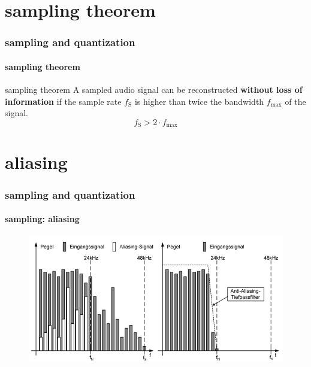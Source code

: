 	\section{sampling theorem}	
		\begin{frame}\frametitle{sampling and quantization}\framesubtitle{sampling theorem}
			\toremember{}
			\begin{block}{sampling theorem}
				\centering
				A sampled audio signal can  be reconstructed \textbf{without loss of information} if the sample rate $f_{\mathrm{S}}$ is higher than twice the bandwidth $f_{\mathrm{max}}$  of the signal.
				\begin{equation*}\label{eq:sample_theorem}	
					f_{\mathrm{S}} > 2\cdot f_{\mathrm{max}}
				\end{equation*}
			\end{block}
		\end{frame}
		
	\section{aliasing}	
		\begin{frame}\frametitle{sampling and quantization}\framesubtitle{sampling: aliasing}
			\begin{figure}
				\begin{center}
					\includegraphics[scale=0.5]{Graph/aliasing}
				\end{center}
			\end{figure} 
		\end{frame}	

